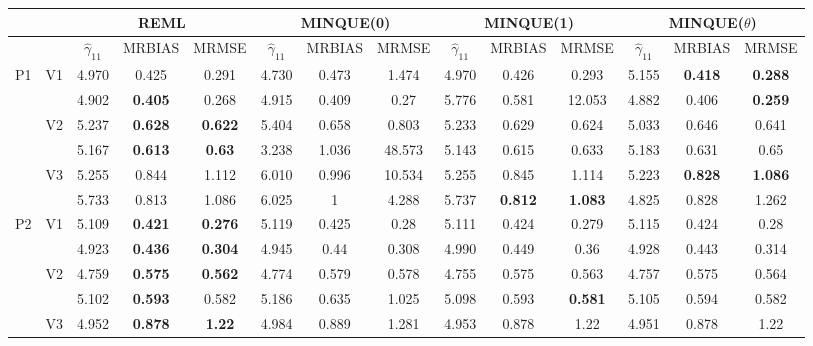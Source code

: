 \documentclass[12pt,a4paper]{article}
\begin{document}
\begin{sidewaystable}[ht]
\centering
{\footnotesize
\begin{tabular}{cc|ccc|ccc|ccc|ccc|}
   & & \multicolumn{3}{c|}{REML}&\multicolumn{3}{c|}{MINQUE(0)}&\multicolumn{3}{c|}{MINQUE(1)}&\multicolumn{3}{c|}{MINQUE($\theta$)}\\ \hline
 &  & $\hat{\gamma}_{11}$ & MRBIAS & MRMSE & $\hat{\gamma}_{11}$ & MRBIAS & MRMSE & $\hat{\gamma}_{11}$ & MRBIAS & MRMSE & $\hat{\gamma}_{11}$ & MRBIAS & MRMSE \\ 
  \hline
\multirow{6}{*}{P1} & \multirow{2}{*}{V1} & 4.970 & 0.425 & 0.291 & 4.730 & 0.473 & 1.474 & 4.970 & 0.426 & 0.293 & 5.155 & \textbf{0.418} & \textbf{0.288} \\ 
   &  & 4.902 & \textbf{0.405} & 0.268 & 4.915 & 0.409 & 0.27 & 5.776 & 0.581 & 12.053 & 4.882 & 0.406 & \textbf{0.259} \\ 
   & \multirow{2}{*}{V2} & 5.237 & \textbf{0.628} & \textbf{0.622} & 5.404 & 0.658 & 0.803 & 5.233 & 0.629 & 0.624 & 5.033 & 0.646 & 0.641 \\ 
   &  & 5.167 & \textbf{0.613} & \textbf{0.63} & 3.238 & 1.036 & 48.573 & 5.143 & 0.615 & 0.633 & 5.183 & 0.631 & 0.65 \\ 
   & \multirow{2}{*}{V3} & 5.255 & 0.844 & 1.112 & 6.010 & 0.996 & 10.534 & 5.255 & 0.845 & 1.114 & 5.223 & \textbf{0.828} & \textbf{1.086} \\ 
   &  & 5.733 & 0.813 & 1.086 & 6.025 & 1 & 4.288 & 5.737 & \textbf{0.812} & \textbf{1.083} & 4.825 & 0.828 & 1.262 \\ 
   \hline \hline\multirow{6}{*}{P2} & \multirow{2}{*}{V1} & 5.109 & \textbf{0.421} & \textbf{0.276} & 5.119 & 0.425 & 0.28 & 5.111 & 0.424 & 0.279 & 5.115 & 0.424 & 0.28 \\ 
   &  & 4.923 & \textbf{0.436} & \textbf{0.304} & 4.945 & 0.44 & 0.308 & 4.990 & 0.449 & 0.36 & 4.928 & 0.443 & 0.314 \\ 
   & \multirow{2}{*}{V2} & 4.759 & \textbf{0.575} & \textbf{0.562} & 4.774 & 0.579 & 0.578 & 4.755 & 0.575 & 0.563 & 4.757 & 0.575 & 0.564 \\ 
   &  & 5.102 & \textbf{0.593} & 0.582 & 5.186 & 0.635 & 1.025 & 5.098 & 0.593 & \textbf{0.581} & 5.105 & 0.594 & 0.582 \\ 
   & \multirow{2}{*}{V3} & 4.952 & \textbf{0.878} & \textbf{1.22} & 4.984 & 0.889 & 1.281 & 4.953 & 0.878 & 1.22 & 4.951 & 0.878 & 1.22 \\ 

\end{tabular}}
\end{sidewaystable}
\end{document}
